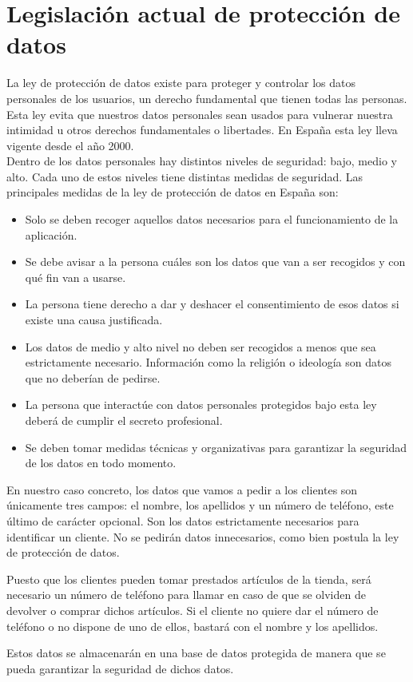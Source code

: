 \chapter{Legislación actual de protección de datos}
\label{chap:law}

La ley de protección de datos existe para proteger y controlar los datos personales de los usuarios, un derecho fundamental que tienen todas las personas. Esta ley evita que nuestros datos personales sean usados para vulnerar nuestra intimidad u otros derechos fundamentales o libertades. En España esta ley lleva vigente desde el año 2000. \\

Dentro de los datos personales hay distintos niveles de seguridad: bajo, medio y alto. Cada uno de estos niveles tiene distintas medidas de seguridad. Las principales medidas de la ley de protección de datos en España son: 

\begin{itemize}
	\item Solo se deben recoger aquellos datos necesarios para el funcionamiento de la aplicación.  
	\item Se debe avisar a la persona cuáles son los datos que van a ser recogidos y con qué fin van a usarse. 
	\item La persona tiene derecho a dar y deshacer el consentimiento de esos datos si existe una causa justificada. 
	\item Los datos de medio y alto nivel no deben ser recogidos a menos que sea estrictamente necesario. Información como la religión o ideología son datos que no deberían de pedirse. 
	\item La persona que interactúe con datos personales protegidos bajo esta ley deberá de cumplir el secreto profesional. 
	\item Se deben tomar medidas técnicas y organizativas para garantizar la seguridad de los datos en todo momento. 
\end{itemize} 

En nuestro caso concreto, los datos que vamos a pedir a los clientes son únicamente tres campos: el nombre, los apellidos y un número de teléfono, este último de carácter opcional. Son los datos estrictamente necesarios para identificar un cliente. No se pedirán datos innecesarios, como bien postula la ley de protección de datos. 

Puesto que los clientes pueden tomar prestados artículos de la tienda, será necesario un número de teléfono para llamar en caso de que se olviden de devolver o comprar dichos artículos. Si el cliente no quiere dar el número de teléfono o no dispone de uno de ellos, bastará con el nombre y los apellidos. 

Estos datos se almacenarán en una base de datos protegida de manera que se pueda garantizar la seguridad de dichos datos. 
